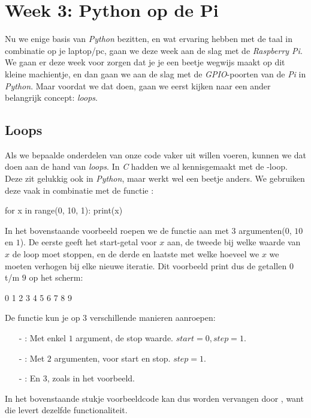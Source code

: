 \chapter{Week 3: Python op de Pi}

Nu we enige basis van \textit{Python} bezitten, en wat ervaring hebben met de taal in combinatie op je laptop/pc, gaan we deze week aan de slag met de \textit{Raspberry Pi}. We gaan er deze week voor zorgen dat je je een beetje wegwijs maakt op dit kleine machientje, en dan gaan we aan de slag met de \textit{GPIO}-poorten van de \textit{Pi} in \textit{Python}. Maar voordat we dat doen, gaan we eerst kijken naar een ander belangrijk concept: \textit{loops}. 

\section{Loops}
Als we bepaalde onderdelen van onze code vaker uit willen voeren, kunnen we dat doen aan de hand van \textit{loops}. In \textit{C} hadden we al kennisgemaakt met de -loop. Deze zit gelukkig ook in \textit{Python}, maar werkt wel een beetje anders. We gebruiken deze vaak in combinatie met de functie :
\begin{python}
for x in range(0, 10, 1):
	print(x)
\end{python}
In het bovenstaande voorbeeld roepen we de functie  aan met 3 argumenten($0$, $10$ en $1$). De eerste geeft het start-getal voor $x$ aan, de tweede bij welke waarde van $x$ de loop moet stoppen, en de derde en laatste met welke hoeveel we $x$ we moeten verhogen bij elke nieuwe iteratie. Dit voorbeeld print dus de getallen $0$ t/m $9$ op het scherm:
\begin{python}
0
1
2
3
4
5
6
7
8
9
\end{python}

\begin{remark}
De functie  kun je op $3$ verschillende manieren aanroepen:
\begin{enumerate}
\item[-] : Met enkel $1$ argument, de stop waarde. $start=0, step=1$.
\item[-] : Met $2$ argumenten, voor start en stop. $step=1$.
\item[-] : En $3$, zoals in het voorbeeld.
\end{enumerate}
In het bovenstaande stukje voorbeeldcode kan dus  worden vervangen door , want die levert dezelfde functionaliteit.
\end{remark}

